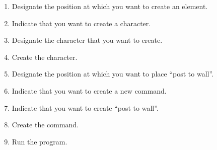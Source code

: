 \begin{enumerate}
  \item Designate the position at which you want to create an element.
  \item Indicate that you want to create a character.
  \item Designate the character that you want to create.
  \item Create the character.
  \item Designate the position at which you want to place ``post to wall''.
  \item Indicate that you want to create a new command.
  \item Indicate that you want to create ``post to wall''.
  \item Create the command.
  \item Run the program.
\end{enumerate}
